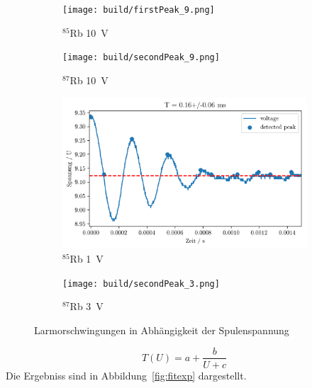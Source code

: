 \begin{figure}[h]
	\centering
	\begin{subfigure}[c]{0.45\textwidth}
	\begin{center}
		\texttt{[image: build/firstPeak\_9.png]}
	\end{center}
	\caption{$^{85}$Rb \SI{10}{\volt}}
	\label{fig:}
	\end{subfigure}
	\begin{subfigure}[c]{0.45\textwidth}
	\begin{center}
		\texttt{[image: build/secondPeak\_9.png]}
	\end{center}
	\caption{$^{87}$Rb \SI{10}{\volt}}
	\label{fig:}
	\end{subfigure}

	\begin{subfigure}[c]{0.45\textwidth}
	\begin{center}
		\includegraphics[width=\textwidth]{picture/firstPeak_3.png}
	\end{center}
	\caption{$^{85}$Rb \SI{1}{\volt}}
	\label{fig:85a}
	\end{subfigure}
	\begin{subfigure}[c]{0.45\textwidth}
	\begin{center}
		\texttt{[image: build/secondPeak\_3.png]}
	\end{center}
	\caption{$^{87}$Rb \SI{3}{\volt}}
	\label{fig:}
	\end{subfigure}
	\caption{Larmorschwingungen in Abhängigkeit der Spulenspannung}
	\label{fig:periode}
\end{figure}
\begin{equation}
	\label{eq:fit}
	T(U) = a + \frac{b}{U + c}
\end{equation}
Die Ergebniss sind in Abbildung~\ref{fig:fitexp} dargestellt.

